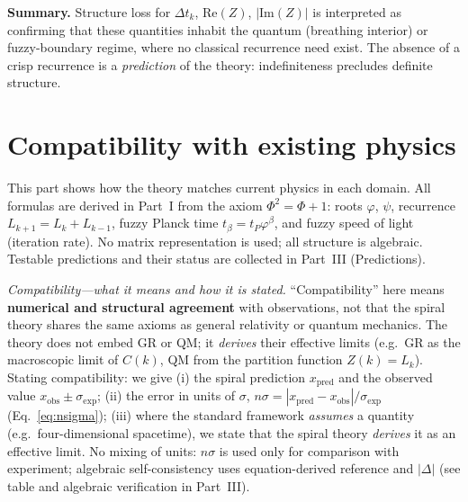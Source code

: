 \documentclass[12pt,a4paper]{article}
\begin{document}
\medskip
\noindent\textbf{Summary.} Structure loss for $\Delta t_k$, $\mathrm{Re}(Z)$, $|\mathrm{Im}(Z)|$ is interpreted as confirming that these quantities inhabit the quantum (breathing interior) or fuzzy-boundary regime, where no classical recurrence need exist. The absence of a crisp recurrence is a \emph{prediction} of the theory: indefiniteness precludes definite structure.




\part{Compatibility with existing physics}
\label{part:compatibility}
\label{part:applications}

\noindent This part shows how the theory matches current physics in each domain. All formulas are derived in Part~I from the axiom $\Phi^2 = \Phi + 1$: roots $\varphi$, $\psi$, recurrence $L_{k+1} = L_k + L_{k-1}$, fuzzy Planck time $t_\beta = t_P\varphi^\beta$, and fuzzy speed of light (iteration rate). No matrix representation is used; all structure is algebraic. Testable predictions and their status are collected in Part~III (Predictions).

\medskip
\noindent\textit{Compatibility---what it means and how it is stated.}
``Compatibility'' here means \textbf{numerical and structural agreement} with observations, not that the spiral theory shares the same axioms as general relativity or quantum mechanics. The theory does not embed GR or QM; it \emph{derives} their effective limits (e.g.\ GR as the macroscopic limit of $C(k)$, QM from the partition function $Z(k)=L_k$). Stating compatibility: we give (i) the spiral prediction $x_{\mathrm{pred}}$ and the observed value $x_{\mathrm{obs}} \pm \sigma_{\mathrm{exp}}$; (ii) the error in units of $\sigma$, $n\sigma = |x_{\mathrm{pred}}-x_{\mathrm{obs}}|/\sigma_{\mathrm{exp}}$ (Eq.~\ref{eq:nsigma}); (iii) where the standard framework \emph{assumes} a quantity (e.g.\ four-dimensional spacetime), we state that the spiral theory \emph{derives} it as an effective limit. No mixing of units: $n\sigma$ is used only for comparison with experiment; algebraic self-consistency uses equation-derived reference and $|\Delta|$ (see table and algebraic verification in Part~III).
\end{document}
